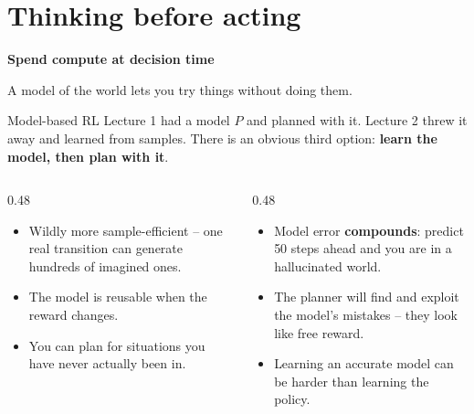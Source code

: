 \documentclass[aspectratio=169]{beamer}
\begin{document}
\section{Thinking before acting}
\begin{frame}[plain]
  \begin{center}
    \vskip 1.6cm
    {\Huge\bfseries\color{popblue}Spend compute at decision time}

    \vskip 0.6cm
    {\large A model of the world lets you try things without doing them.}
  \end{center}
\end{frame}

\begin{frame}{Model-based RL}
  \small
  Lecture 1 had a model $P$ and planned with it. Lecture 2 threw it away and learned from
  samples. There is an obvious third option: \textbf{learn the model, then plan with it}.

  \vskip 8pt
  \begin{columns}[T]
    \begin{column}{0.48\textwidth}
      \begin{tcolorbox}[colback=paramgreen!8, colframe=paramgreen, boxrule=0.6pt, arc=2pt,
                        title={\textbf{Why it is attractive}}]
        \small
        \begin{itemize}\itemsep2pt
          \item Wildly more sample-efficient -- one real transition can generate hundreds of
                imagined ones.
          \item The model is reusable when the reward changes.
          \item You can plan for situations you have never actually been in.
        \end{itemize}
      \end{tcolorbox}
    \end{column}
    \begin{column}{0.48\textwidth}
      \begin{tcolorbox}[colback=armred!8, colframe=armred, boxrule=0.6pt, arc=2pt,
                        title={\textbf{Why it is hard}}]
        \small
        \begin{itemize}\itemsep2pt
          \item Model error \textbf{compounds}: predict 50 steps ahead and you are in a
                hallucinated world.
          \item The planner will find and exploit the model's mistakes -- they look like free
                reward.
          \item Learning an accurate model can be harder than learning the policy.
        \end{itemize}
      \end{tcolorbox}
    \end{column}
  \end{columns}


\end{frame}
\end{document}
